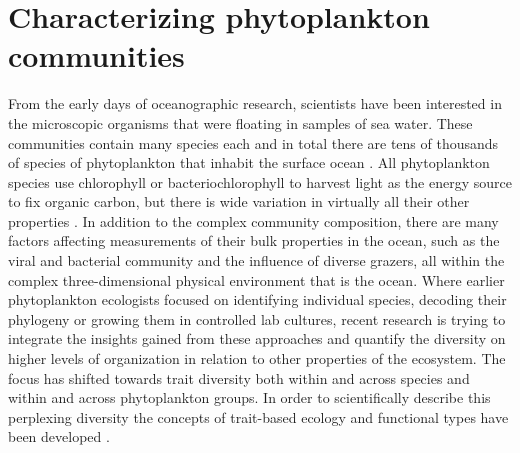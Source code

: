 \section{Characterizing phytoplankton communities}
From the early days of oceanographic research, scientists have been interested in the microscopic organisms that were floating in samples of sea water. These communities contain many species each and in total there are tens of thousands of species of phytoplankton that inhabit the surface ocean \citep{DeVargas2015}. 
All phytoplankton species use chlorophyll or bacteriochlorophyll to harvest light as the energy source to fix organic carbon, but there is wide variation in virtually all their other properties \citep{Litchman2008}. 
In addition to the complex community composition, there are many factors affecting measurements of their bulk properties in the ocean, such as the viral and bacterial community and the influence of diverse grazers, all within the complex three-dimensional physical environment that is the ocean. 
Where earlier phytoplankton ecologists focused on identifying individual species, decoding their phylogeny or growing them in controlled lab cultures, recent research is trying to integrate the insights gained from these approaches and quantify the diversity on higher levels of organization in relation to other properties of the ecosystem. 
The focus has shifted towards trait diversity
 both within and across species and within and across phytoplankton groups. In order to scientifically describe this perplexing diversity the concepts of trait-based ecology and functional types have been developed \citep{Tilman2001,McGill2006,Violle2007c}.


